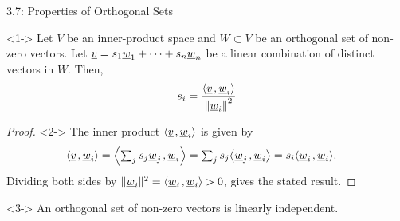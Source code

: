 \documentclass[10pt,english,aspectratio=169]{beamer}
\begin{document}
\begin{frame}{3.7: Properties of Orthogonal Sets}

\vspace{-1mm}

\begin{lemma}<1->
Let $V$ be an inner-product space and $W\subset V$ be an orthogonal set of non-zero vectors.
Let $\underline{v} = s_1 \underline{w}_1 + \cdots + s_n \underline{w}_n$ be a linear combination of distinct vectors in $W$.
Then, \vspace{-4mm}
\[ s_i = \frac{ {\left\langle  \underline{v}  \mskip2mu ,  \underline{w}_i  \right\rangle} }
{ \left\| \underline{w}_i \right\|^2 }\]
\end{lemma}

\vspace{-1mm}

\begin{proof}<2->
The inner product ${\left\langle  \underline{v}  \mskip2mu ,  \underline{w}_i  \right\rangle}$ is given by \vspace{-1.5mm}
\begin{equation*}
\begin{split}
\inner{ \vecnot{v} }{ \vecnot{w}_i }
&= \inner{ \textstyle\sum_j s_j \vecnot{w}_j }{ \vecnot{w}_i }
= \textstyle\sum_j s_j \inner{ \vecnot{w}_j }{ \vecnot{w}_i }
= s_i \inner{ \vecnot{w}_i }{ \vecnot{w}_i } .
\end{split} \vspace{-2.5mm}
\end{equation*}
Dividing both sides by $\| \underline{w}_i \|^2 = {\left\langle  \underline{w}_i  \mskip2mu ,  \underline{w}_i  \right\rangle} > 0$, gives the stated result.
\end{proof}

\begin{theorem}<3->
An orthogonal set of non-zero vectors is linearly independent.
\end{theorem}


\end{frame}
\end{document}
